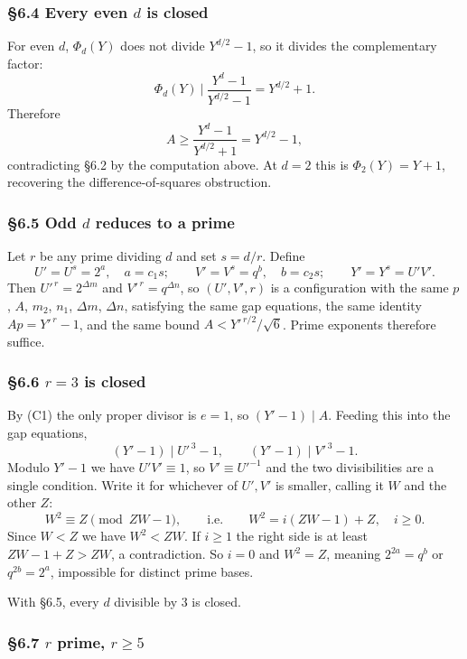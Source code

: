 \documentclass[11pt]{article}
\begin{document}
\subsubsection*{\S6.4 Every even $d$ is closed}

For even $d$, $\Phi_d(Y)$ does not divide $Y^{d/2}-1$, so it divides the complementary factor:
\[
\Phi_d(Y) \ \Big| \ \frac{Y^d-1}{Y^{d/2}-1} = Y^{d/2}+1 .
\]
Therefore
\[
A \geq \frac{Y^d-1}{Y^{d/2}+1} = Y^{d/2}-1,
\]
contradicting \S6.2 by the computation above. At $d = 2$ this is $\Phi_2(Y) = Y+1$, recovering the difference-of-squares obstruction.

\subsubsection*{\S6.5 Odd $d$ reduces to a prime}

Let $r$ be any prime dividing $d$ and set $s = d/r$. Define
\[
U' = U^{s} = 2^{a}, \quad a = c_1 s; \qquad V' = V^{s} = q^{b}, \quad b = c_2 s; \qquad Y' = Y^{s} = U'V' .
\]
Then $U'^{\,r} = 2^{\Delta m}$ and $V'^{\,r} = q^{\Delta n}$, so $(U', V', r)$ is a configuration with the same $p$, $A$, $m_2$, $n_1$, $\Delta m$, $\Delta n$, satisfying the same gap equations, the same identity $Ap = Y'^{\,r}-1$, and the same bound $A < Y'^{\,r/2}/\sqrt6$. Prime exponents therefore suffice.

\subsubsection*{\S6.6 $r = 3$ is closed}

By (C1) the only proper divisor is $e = 1$, so $(Y'-1) \mid A$. Feeding this into the gap equations,
\[
(Y'-1) \mid U'^{\,3}-1, \qquad (Y'-1) \mid V'^{\,3}-1 .
\]
Modulo $Y'-1$ we have $U'V' \equiv 1$, so $V' \equiv U'^{-1}$ and the two divisibilities are a single condition. Write it for whichever of $U', V'$ is smaller, calling it $W$ and the other $Z$:
\[
W^2 \equiv Z \pmod{ZW-1}, \qquad\text{i.e.}\qquad W^2 = i(ZW-1) + Z, \quad i \geq 0 .
\]
Since $W < Z$ we have $W^2 < ZW$. If $i \geq 1$ the right side is at least $ZW - 1 + Z > ZW$, a contradiction. So $i = 0$ and $W^2 = Z$, meaning $2^{2a} = q^{b}$ or $q^{2b} = 2^{a}$, impossible for distinct prime bases.

With \S6.5, every $d$ divisible by $3$ is closed.

\subsubsection*{\S6.7 $r$ prime, $r \geq 5$}
\end{document}
